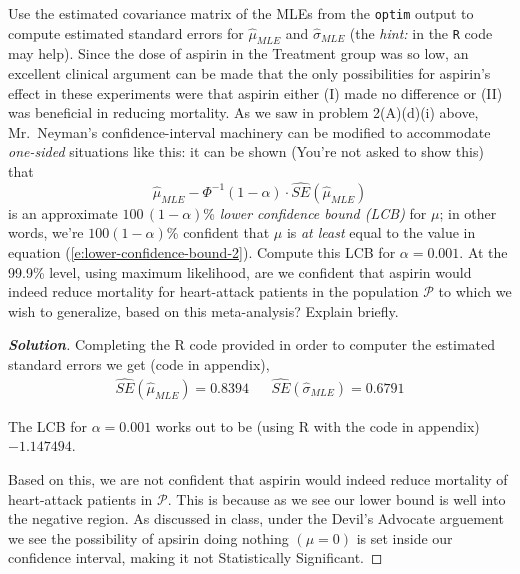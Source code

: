 \documentclass[12pt]{article}
\newenvironment{solution}{\begin{tcolorbox}[breakable]\begin{proof}[\textbf{\textit{Solution}}] }{\end{proof}\end{tcolorbox}}
\begin{document}
\begin{itemize}
\begin{itemize}
Use the estimated covariance matrix of the MLEs from the \texttt{optim} output to compute estimated standard errors for $\hat{ \mu }_{ MLE }$ and $\hat{ \sigma }_{ MLE }$ (the \textit{hint:} in the \texttt{R} code may help). \textit{\fbox{\textbf{[10 points]}}} \vspace*{0.025in} Since the dose of aspirin in the Treatment group was so low, an excellent clinical argument can be made that the only possibilities for aspirin's effect in these experiments were that aspirin either (I) made no difference or (II) was beneficial in reducing mortality. As we saw in problem 2(A)(d)(i) above, Mr.~Neyman's confidence-interval machinery can be modified to accommodate \textit{one-sided} situations like this: it can be shown (You're not asked to show this) that
\begin{equation} \label{e:lower-confidence-bound-2}
\hat{ \mu }_{ MLE } - \Phi^{ -1 } ( 1 - \alpha ) \cdot \widehat{ SE } \left( \hat{ \mu }_{ MLE } \right)
\end{equation}
is an approximate $100 \, ( 1 - \alpha )$\% \textit{lower confidence bound (LCB)} for $\mu$; in other words, we're $100 ( 1 - \alpha )$\% confident that $\mu$ is \textit{at least} equal to the value in equation (\ref{e:lower-confidence-bound-2}). Compute this LCB for $\alpha = 0.001$. \textit{\fbox{\textbf{[5 points]}}} \vspace*{0.025in} At the 99.9\% level, using maximum likelihood, are we confident that aspirin would indeed reduce mortality for heart-attack patients in the population $\mathcal{ P }$ to which we wish to generalize, based on this meta-analysis? Explain briefly. \textit{\fbox{\textbf{[10 points]}}}

\begin{solution}
    Completing the R code provided in order to computer the estimated standard errors we get (code in appendix), 
    \begin{align*}
        \widehat{SE}(\hat{\mu}_{MLE}) = 0.8394 && \widehat{SE}(\hat{\sigma}_{MLE}) = 0.6791
    \end{align*}

    The LCB for $\alpha = 0.001$ works out to be (using R with the code in appendix) $-1.147494$.
    
    Based on this, we are not confident that aspirin would indeed reduce mortality of heart-attack patients in $\mathcal{P}$. This is because as we see our lower bound is well into the negative region. As discussed in class, under the Devil's Advocate arguement we see the possibility of apsirin doing nothing $(\mu = 0)$ is set inside our confidence interval, making it not Statistically Significant. 
\end{solution}

\end{itemize}

\end{itemize}
\end{document}
